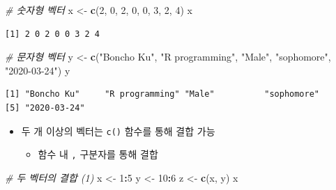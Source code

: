 \documentclass[
  11pt,
]{krantz}
\newenvironment{Shaded}{\begin{snugshade}}{\end{snugshade}}
\newcommand{\CommentTok}[1]{\textcolor[rgb]{0.37,0.37,0.37}{\textit{#1}}}
\newcommand{\DecValTok}[1]{\textcolor[rgb]{0.06,0.06,0.06}{#1}}
\newcommand{\KeywordTok}[1]{\textcolor[rgb]{0.27,0.27,0.27}{\textbf{#1}}}
\newcommand{\NormalTok}[1]{#1}
\newcommand{\OperatorTok}[1]{\textcolor[rgb]{0.43,0.43,0.43}{\textbf{#1}}}
\newcommand{\StringTok}[1]{\textcolor[rgb]{0.5,0.5,0.5}{#1}}
\providecommand{\tightlist}{%
  \setlength{\itemsep}{0pt}\setlength{\parskip}{0pt}}
\begin{document}
\footnotesize

\begin{Shaded}
\begin{Highlighting}[]
\CommentTok{# 숫자형 벡터 }
\NormalTok{x <-}\StringTok{ }\KeywordTok{c}\NormalTok{(}\DecValTok{2}\NormalTok{, }\DecValTok{0}\NormalTok{, }\DecValTok{2}\NormalTok{, }\DecValTok{0}\NormalTok{, }\DecValTok{0}\NormalTok{, }\DecValTok{3}\NormalTok{, }\DecValTok{2}\NormalTok{, }\DecValTok{4}\NormalTok{)}
\NormalTok{x}
\end{Highlighting}
\end{Shaded}

\begin{verbatim}
[1] 2 0 2 0 0 3 2 4
\end{verbatim}

\begin{Shaded}
\begin{Highlighting}[]
\CommentTok{# 문자형 벡터}
\NormalTok{y <-}\StringTok{ }\KeywordTok{c}\NormalTok{(}\StringTok{"Boncho Ku"}\NormalTok{, }\StringTok{"R programming"}\NormalTok{, }\StringTok{"Male"}\NormalTok{, }\StringTok{"sophomore"}\NormalTok{, }\StringTok{"2020-03-24"}\NormalTok{)}
\NormalTok{y}
\end{Highlighting}
\end{Shaded}

\begin{verbatim}
[1] "Boncho Ku"     "R programming" "Male"          "sophomore"    
[5] "2020-03-24"   
\end{verbatim}

\normalsize

\begin{itemize}
\tightlist
\item
  두 개 이상의 벡터는 \texttt{c()} 함수를 통해 결합 가능

  \begin{itemize}
  \tightlist
  \item
    함수 내 \texttt{,} 구분자를 통해 결합
  \end{itemize}
\end{itemize}

\footnotesize

\begin{Shaded}
\begin{Highlighting}[]
\CommentTok{# 두 벡터의 결합 (1)}
\NormalTok{x <-}\StringTok{ }\DecValTok{1}\OperatorTok{:}\DecValTok{5}
\NormalTok{y <-}\StringTok{ }\DecValTok{10}\OperatorTok{:}\DecValTok{6}
\NormalTok{z <-}\StringTok{ }\KeywordTok{c}\NormalTok{(x, y)}
\NormalTok{x}
\end{Highlighting}
\end{Shaded}
\end{document}
